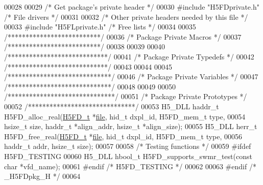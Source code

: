 \begin{DoxyCode}
00028 
00029 \textcolor{comment}{/* Get package's private header */}
00030 \textcolor{preprocessor}{#include "H5FDprivate.h"}    \textcolor{comment}{/* File drivers             */}
00031 
00032 \textcolor{comment}{/* Other private headers needed by this file */}
00033 \textcolor{preprocessor}{#include "H5FLprivate.h"}    \textcolor{comment}{/* Free lists                           */}
00034 
00035 \textcolor{comment}{/**************************/}
00036 \textcolor{comment}{/* Package Private Macros */}
00037 \textcolor{comment}{/**************************/}
00038 
00039 
00040 \textcolor{comment}{/****************************/}
00041 \textcolor{comment}{/* Package Private Typedefs */}
00042 \textcolor{comment}{/****************************/}
00043 
00044 
00045 \textcolor{comment}{/*****************************/}
00046 \textcolor{comment}{/* Package Private Variables */}
00047 \textcolor{comment}{/*****************************/}
00048 
00049 
00050 \textcolor{comment}{/******************************/}
00051 \textcolor{comment}{/* Package Private Prototypes */}
00052 \textcolor{comment}{/******************************/}
00053 H5\_DLL haddr\_t H5FD\_alloc\_real(\hyperlink{struct_h5_f_d__t}{H5FD\_t} *\hyperlink{structfile}{file}, hid\_t dxpl\_id, H5FD\_mem\_t type,
00054     hsize\_t size, haddr\_t *align\_addr, hsize\_t *align\_size);
00055 H5\_DLL herr\_t H5FD\_free\_real(\hyperlink{struct_h5_f_d__t}{H5FD\_t} *\hyperlink{structfile}{file}, hid\_t dxpl\_id, H5FD\_mem\_t type,
00056     haddr\_t addr, hsize\_t size);
00057 
00058 \textcolor{comment}{/* Testing functions */}
00059 \textcolor{preprocessor}{#ifdef H5FD\_TESTING}
00060 H5\_DLL hbool\_t H5FD\_supports\_swmr\_test(\textcolor{keyword}{const} \textcolor{keywordtype}{char} *vfd\_name);
00061 \textcolor{preprocessor}{#endif }\textcolor{comment}{/* H5FD\_TESTING */}\textcolor{preprocessor}{}
00062 
00063 \textcolor{preprocessor}{#endif }\textcolor{comment}{/* \_H5FDpkg\_H */}\textcolor{preprocessor}{}
00064 
\end{DoxyCode}
